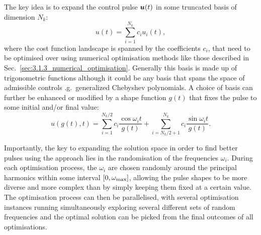 The key idea is to expand the control pulse $\boldsymbol{u}(t)$ in some truncated basis of dimension $N_k$: 
\begin{equation}\label{eq:basic_CRAB}
    u(t) = \sum_{i = 1}^{N_k} c_i u_i(t),
\end{equation}
where the cost function landscape is spanned by the coefficients $c_i$, that need to be optimised over using numerical optimisation methods like those described in Sec.~\ref{sec:3.1.3_numerical_optimisation}. Generally this basis is made up of trigonometric functions although it could be any basis that spans the space of admissible controls \@e.g.~generalized Chebyshev polynomials. A choice of basis can further be enhanced or modified by a shape function $g(t)$ that fixes the pulse to some initial and/or final value:
\begin{equation}\label{eq:trigonometric_CRAB}
    u(g(t),t) = \sum_{i = 1}^{N_k/2} c_i \frac{\cos{\omega_i t}}{g(t)} + \sum_{i = N_k/2 + 1}^{N_k} c_i \frac{\sin{\omega_i} t}{g(t)}.
\end{equation}

Importantly, the key to expanding the solution space in order to find better pulses using the  approach lies in the randomisation of the frequencies $\omega_i$. During each optimisation process, the $\omega_i$ are chosen randomly around the principal harmonics within some interval $[0, \omega_{\rm max}]$, allowing the pulse shapes to be more diverse and more complex than by simply keeping them fixed at a certain value. The optimisation process can then be parallelised, with several optimisation instances running simultaneously exploring several different sets of random frequencies and the optimal solution can be picked from the final outcomes of all optimisations. 

